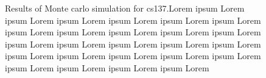{\begin{figure}[!htb]
{    \label{fig:}
  }
  \caption{Results of Monte carlo simulation for cs137.Lorem ipsum  Lorem ipsum Lorem ipsum Lorem ipsum Lorem ipsum Lorem ipsum Lorem ipsum Lorem ipsum Lorem ipsum Lorem ipsum Lorem ipsum Lorem ipsum Lorem ipsum Lorem ipsum Lorem ipsum Lorem ipsum Lorem ipsum Lorem ipsum Lorem ipsum Lorem ipsum Lorem ipsum Lorem ipsum Lorem ipsum Lorem ipsum Lorem ipsum Lorem }
  \label{fig:e2}
\end{figure}%

}%
